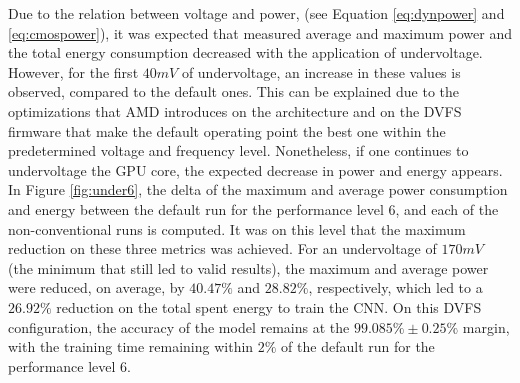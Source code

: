 Due to the relation between voltage and power, (see Equation \ref{eq:dynpower} and \ref{eq:cmospower}), it was expected that measured average and maximum power and the total energy consumption decreased with the application of undervoltage. However, for the first $40mV$ of undervoltage, an increase in these values is observed, compared to the default ones. This can be explained due to the optimizations that AMD introduces on the architecture and on the DVFS firmware that make the default operating point the best one within the predetermined voltage and frequency level. Nonetheless, if one continues to undervoltage the GPU core, the expected decrease in power and energy appears. In Figure \ref{fig:under6}, the delta of the maximum and average power consumption and energy between the default run for the performance level 6, and each of the non-conventional runs is computed. It was on this level that the maximum reduction on these three metrics was achieved. For an undervoltage of $170mV$ (the minimum that still led to valid results), the maximum and average power were reduced, on average,  by $40.47\%$ and  $28.82\%$,  respectively, which led to a $26.92\%$ reduction on the total spent energy to train the CNN. On this DVFS configuration, the accuracy of the model remains at the $99.085\% \pm 0.25\%$ margin, with the training time remaining within $2\%$ of the default run for the performance level 6.


